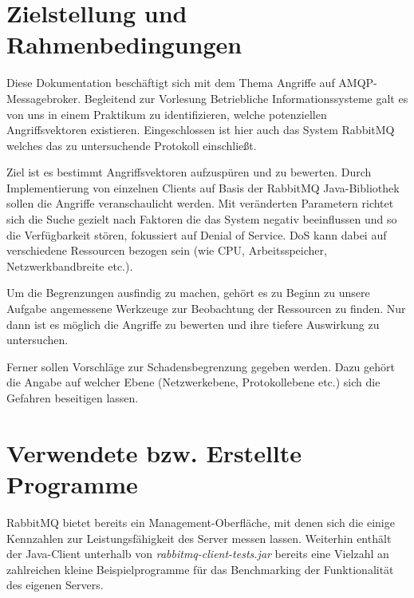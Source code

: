 \documentclass[	a4paper,
			11pt,
			oneside,
			parskip]{scrartcl}
\begin{document}
	
	
\section*{Zielstellung und Rahmenbedingungen}
	
	Diese Dokumentation beschäftigt sich mit dem Thema \glqq Angriffe auf AMQP-Messagebroker\grqq. Begleitend zur Vorlesung  \glqq Betriebliche Informationssysteme\grqq\/ galt es von uns in einem
	Praktikum zu identifizieren, welche potenziellen Angriffsvektoren existieren. Eingeschlossen ist hier auch das System \glqq RabbitMQ\grqq\/ welches das zu untersuchende Protokoll einschließt.

	Ziel ist es bestimmt Angriffsvektoren aufzuspüren und zu bewerten. Durch Implementierung von einzelnen Clients auf Basis der RabbitMQ Java-Bibliothek sollen die Angriffe veranschaulicht werden.
	Mit veränderten Parametern richtet sich die Suche gezielt nach Faktoren die das System negativ beeinflussen und so die Verfügbarkeit stören, fokussiert auf \glqq Denial of Service\grqq. DoS
	kann dabei auf verschiedene Ressourcen bezogen sein (wie CPU, Arbeitsspeicher, Netzwerkbandbreite etc.).

	Um die Begrenzungen ausfindig zu machen, gehört es zu Beginn zu unsere Aufgabe angemessene Werkzeuge zur Beobachtung der Ressourcen zu finden. Nur dann ist es möglich die Angriffe zu bewerten
	und ihre tiefere Auswirkung zu untersuchen.

	Ferner sollen Vorschläge zur Schadensbegrenzung gegeben werden. Dazu gehört die Angabe auf welcher Ebene (Netzwerkebene, Protokollebene etc.) sich die Gefahren beseitigen lassen.



%	
%
\clearpage
\section*{Verwendete bzw. Erstellte Programme}
	
	RabbitMQ bietet bereits ein Management-Oberfläche, mit denen sich die einige Kennzahlen zur Leistungsfähigkeit des Server messen lassen. Weiterhin enthält der Java-Client unterhalb von
	\textit{rabbitmq-client-tests.jar} bereits eine Vielzahl an zahlreichen kleine Beispielprogramme für das Benchmarking der Funktionalität des eigenen Servers.  
	
\end{document}
